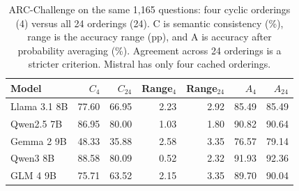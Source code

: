 \begin{table}[htbp]
\centering\small\setlength{\tabcolsep}{4pt}
\caption{ARC-Challenge on the same 1,165 questions: four cyclic orderings (4) versus all 24 orderings (24). C is semantic consistency (\%), range is the accuracy range (pp), and A is accuracy after probability averaging (\%). Agreement across 24 orderings is a stricter criterion. Mistral has only four cached orderings.}
\label{tab:arc-full}
\begin{tabular}{lrrrrrr}
\toprule
Model & $C_4$ & $C_{24}$ & Range$_4$ & Range$_{24}$ & $A_4$ & $A_{24}$\\
\midrule
Llama 3.1 8B & 77.60 & 66.95 & 2.23 & 2.92 & 85.49 & 85.49\\
Qwen2.5 7B & 86.95 & 80.00 & 1.03 & 1.80 & 90.82 & 90.64\\
Gemma 2 9B & 48.33 & 35.88 & 2.58 & 3.35 & 76.57 & 79.14\\
Qwen3 8B & 88.58 & 80.09 & 0.52 & 2.32 & 91.93 & 92.36\\
GLM 4 9B & 75.71 & 63.52 & 2.15 & 3.35 & 89.70 & 90.04\\
\bottomrule
\end{tabular}
\end{table}

